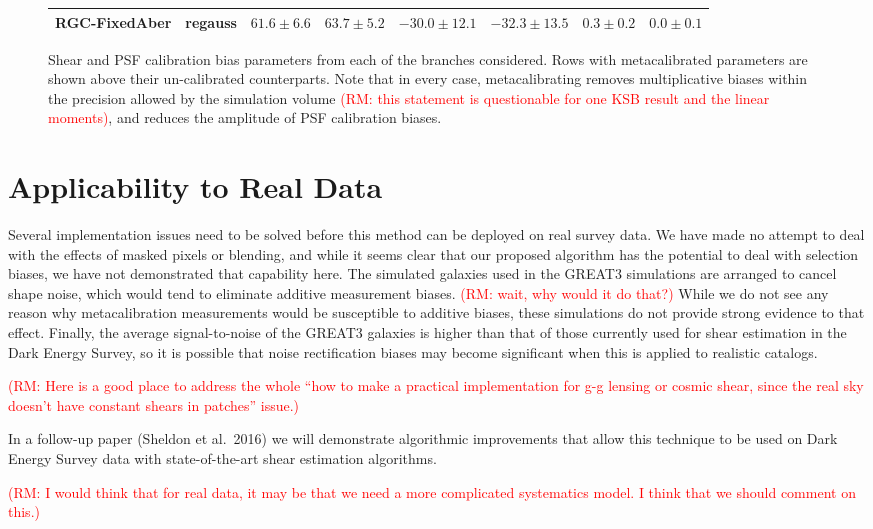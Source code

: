 \documentclass[iop]{emulateapj}
\newcommand\rmcomment[1]{\textcolor{red}{(RM: #1)}}
\begin{document}
\begin{figure}
{\begin{tabular}{l  c |cc | cc |cc }
RGC-FixedAber  & regauss  &  $61.6\pm6.6$ & $63.7\pm5.2$  & $-30.0\pm12.1$ & $-32.3\pm13.5$ &  $0.3\pm0.2$ & $0.0\pm0.1$ \\
\hline
\end{tabular}
}
\caption{Shear and PSF calibration bias parameters from each of the
  branches considered. Rows with metacalibrated parameters are shown
  above their un-calibrated counterparts. Note that in every case,
  metacalibrating removes multiplicative biases within the precision
  allowed by the simulation volume \rmcomment{this statement is questionable for one KSB result and
    the linear moments}, and reduces the amplitude of PSF
  calibration biases.}
\label{table:results}
\end{figure}

\section{Applicability to Real Data}
Several implementation issues need to be solved before this method can
be deployed on real survey data. We have made no attempt to deal with
the effects of masked pixels or blending, and while it seems clear
that our proposed algorithm has the potential to deal with selection
biases, we have not demonstrated that capability here.  The simulated
galaxies used in the GREAT3 simulations are arranged to cancel shape
noise, which would tend to eliminate additive measurement
biases. \rmcomment{wait, why would it do that?} While we do not see any reason why metacalibration
measurements would be susceptible to additive biases, these
simulations do not provide strong evidence to that effect. Finally,
the average signal-to-noise of the GREAT3 galaxies is higher than that
of those currently used for shear estimation in the Dark Energy
Survey, so it is possible that noise rectification biases may become
significant when this is applied to realistic catalogs.

\rmcomment{Here is a good place to address the whole ``how to make a practical implementation for
  g-g lensing or cosmic shear, since the real sky doesn't have constant shears in patches'' issue.}

In a follow-up paper (Sheldon et al.\ 2016) we will demonstrate
algorithmic improvements that allow this technique to be used on Dark
Energy Survey data with state-of-the-art shear estimation algorithms.

\rmcomment{I would think that for real data, it may be that we need a more complicated systematics
  model.  I think that we should comment on this.}
\end{document}
